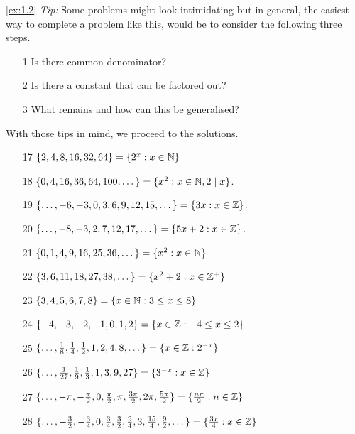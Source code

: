 \begin{solution}\label{sol:1.2}\ref{ex:1.2}
    \emph{Tip:} Some problems might look intimidating but in general, the easiest way to complete a problem like this, would be to consider the following three steps. 
    \begin{enumerate}
        \item [1] Is there common denominator? 
        \item [2] Is there a constant that can be factored out? 
        \item [3] What remains and how can this be generalised? 
    \end{enumerate}
    With those tips in mind, we proceed to the solutions. 
    \begin{enumerate}
        \item[17] $\{ 2,4,8,16,32,64 \}=\{ 2^x:x\in\mathbb{N} \}$
        \item[18] $\{ 0,4,16,36,64,100,\dots \}=\{ x^2:x\in\mathbb{N},2\mid x \}$.
        \item[19] $\{ \dots,-6,-3,0,3,6,9,12,15,\dots \}=\{ 3x:x\in\mathbb{Z} \}$.
        \item[20] $\{ \dots,-8,-3,2,7,12,17,\dots \}=\{ 5x+2:x\in\mathbb{Z} \}$.
        \item[21] $\{ 0,1,4,9,16,25,36,\dots \}=\{ x^{2}:x\in\mathbb{N}\}$
        \item[22] $\{ 3,6,11,18,27,38,\dots \}=\{x^2+2:x\in\mathbb{Z}^{+}\}$
        \item[23] $\{ 3,4,5,6,7,8 \}=\{ x\in\mathbb{N}: 3\le x \le 8 \}$
        \item[24] $\{ -4,-3,-2,-1,0,1,2 \}=\{ x\in\mathbb{Z}:-4\le x \le 2 \}$
        \item[25] $\{ \dots,\frac{1}{8},\frac{1}{4},\frac{1}{2},1,2,4,8,\dots \}=\{x\in\mathbb{Z}: 2^{-x} \}$  
        \item[26] $\{ \dots,\frac{1}{27},\frac{1}{9},\frac{1}{3},1,3,9,27 \}=\{ 3^{-x}:x\in\mathbb{Z} \}$
        \item[27] $\{ \dots,-\pi,-\frac{\pi}{2},0,\frac{\pi}{2},\pi,\frac{3\pi}{2},2\pi,\frac{5\pi}{2} \}=\{ \frac{n\pi}{2}:n\in\mathbb{Z} \}$
        \item[28] $\{ \dots,-\frac{3}{2},-\frac{3}{4},0,\frac{3}{4},\frac{3}{2},\frac{9}{4},3,\frac{15}{4},\frac{9}{2},\dots \}=\{ \frac{3x}{4}:x\in\mathbb{Z} \}$   
    \end{enumerate}
\end{solution}

